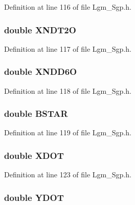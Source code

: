 Definition at line 116 of file Lgm\_\-Sgp.h.\hypertarget{struct___sgp_info_524a63b4890023f57824dbd323fa4bc8}{
\subsubsection[{XNDT2O}]{\setlength{\rightskip}{0pt plus 5cm}double {\bf XNDT2O}}}
\label{struct___sgp_info_524a63b4890023f57824dbd323fa4bc8}




Definition at line 117 of file Lgm\_\-Sgp.h.\hypertarget{struct___sgp_info_317e80d6b4bbe1395b92c56947740716}{
\subsubsection[{XNDD6O}]{\setlength{\rightskip}{0pt plus 5cm}double {\bf XNDD6O}}}
\label{struct___sgp_info_317e80d6b4bbe1395b92c56947740716}




Definition at line 118 of file Lgm\_\-Sgp.h.\hypertarget{struct___sgp_info_44e631843bf304236d4a37d7ce0ef549}{
\subsubsection[{BSTAR}]{\setlength{\rightskip}{0pt plus 5cm}double {\bf BSTAR}}}
\label{struct___sgp_info_44e631843bf304236d4a37d7ce0ef549}




Definition at line 119 of file Lgm\_\-Sgp.h.\hypertarget{struct___sgp_info_3c2788a0eb0527cf6b39bf2efcedc9d8}{
\subsubsection[{XDOT}]{\setlength{\rightskip}{0pt plus 5cm}double {\bf XDOT}}}
\label{struct___sgp_info_3c2788a0eb0527cf6b39bf2efcedc9d8}




Definition at line 123 of file Lgm\_\-Sgp.h.\hypertarget{struct___sgp_info_63b51d09dc1b7c17d7822ecf0276c303}{
\subsubsection[{YDOT}]{\setlength{\rightskip}{0pt plus 5cm}double {\bf YDOT}}}
\label{struct___sgp_info_63b51d09dc1b7c17d7822ecf0276c303}




